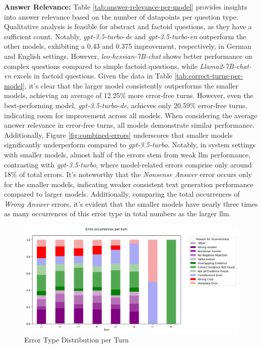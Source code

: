 \noindent\textbf{Answer Relevance:} Table \ref{tab:answer-relevance-per-model} provides insights into answer relevance based on the number of datapoints per question type. Qualitative analysis is feasible for abstract and factoid questions, as they have a sufficient count. Notably, \textit{gpt-3.5-turbo-de} and \textit{gpt-3.5-turbo-en} outperform the other models, exhibiting a 0.43 and 0.375 improvement, respectively, in German and English settings. However, \textit{leo-hessian-7B-chat} shows better performance on complex questions compared to simple factoid questions, while \textit{Llama2-7B-chat-en} excels in factoid questions. Given the data in Table \ref{tab:correct-turns-per-model}, it's clear that the larger model consistently outperforms the smaller models, achieving an average of 12.25\% more error-free turns. However, even the best-performing model, \textit{gpt-3.5-turbo-de}, achieves only 20.59\% error-free turns, indicating room for improvement across all models. When considering the average answer relevance in error-free turns, all models demonstrate similar performance. Additionally, Figure \ref{fig:combined-errors} underscores that smaller models significantly underperform compared to \textit{gpt-3.5-turbo}. Notably, in system settings with smaller models, almost half of the errors stem from weak \gls{llm} performance, contrasting with \textit{gpt-3.5-turbo}, where model-related errors comprise only around 18\% of total errors. It's noteworthy that the \textit{Nonsense Answer} error occurs only for the smaller models, indicating weaker consistent text generation performance compared to larger models. Additionally, comparing the total occurrences of \textit{Wrong Answer} errors, it's evident that the smaller models have nearly three times as many occurrences of this error type in total numbers as the larger \gls{llm}.


\begin{figure}[h]
    \centering
    \includegraphics[width=\textwidth]{Grafiken/Evaluation/EndToEnd/Turns-Errors.png}
    \caption{Error Type Distribution per Turn}
    \label{fig:question-type-turn}
\end{figure}

